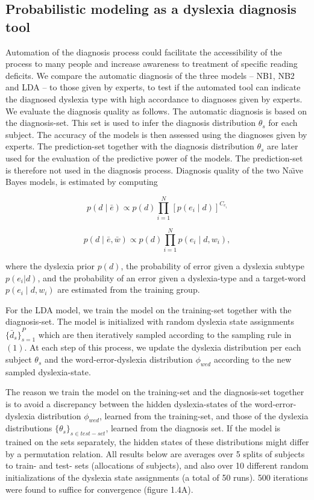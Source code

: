 {{\subsection{Probabilistic modeling as a dyslexia diagnosis tool}
Automation of the diagnosis process could facilitate the accessibility of the process to many people and increase awareness to treatment of specific reading deficits. We compare the automatic diagnosis of the three models -- NB1, NB2 and LDA -- to those given by experts, to test if the automated tool can indicate the diagnosed dyslexia type with high accordance to diagnoses given by experts.
We evaluate the diagnosis quality as follows. The automatic diagnosis is based on the diagnosis-set. This set is used to infer the diagnosis distribution $ \theta_{s} $ for each subject. The accuracy of the models is then assessed using the diagnoses given by experts. The prediction-set together with the diagnosis distribution $ \theta_{s} $ are later used for the evaluation of the predictive power of the models. The prediction-set is therefore not used in the diagnosis process.
Diagnosis quality of the two Na\"{\i}ve Bayes models, is estimated by computing 

\begin{equation}
p(d \mid \bar{e}) \propto p(d) \prod_{i = 1}^N [p(e_i \mid d)]^{C_{e_i}}
\end{equation}

\begin{equation}
p(d \mid \bar{e}, \bar{w}) \propto p(d) \prod_{i = 1}^N p(e_i \mid d, w_i),
\end{equation}

where the dyslexia prior $ p(d) $, the probability of error given a dyslexia subtype $ p(e_i |d) $, and the probability of an error given a dyslexia-type and a target-word $ p(e_i \mid d,w_i ) $ are estimated from the training group.

For the LDA model, we train the model on the training-set together with the diagnosis-set. The model is initialized with random dyslexia state assignments $ { \{ \bar{d}_{s} \} }_{s=1}^P $ which are then iteratively sampled according to the sampling rule in $(1)$. At each step of this process, we update the dyslexia distribution per each subject $ \theta_{s} $ and the word-error-dyslexia distribution $ \phi_{wed} $ according to the new sampled dyslexia-state.

The reason we train the model on the training-set and the diagnosis-set together is to avoid a discrepancy between the hidden dyslexia-states of the word-error-dyslexia distribution $ \phi_{wed} $, learned from the training-set, and those of the dyslexia distributions $ { \{ \theta_{s} \} }_{s \in test-set} $, learned from the diagnosis set. If the model is trained on the sets separately, the hidden states of these distributions might differ by a permutation relation. All results below are averages over 5 splits of subjects to train- and test- sets (allocations of subjects), and also over 10 different random initializations of the dyslexia state assignments (a total of 50 runs). 500 iterations were found to suffice for convergence (figure 1.4A).

}}
